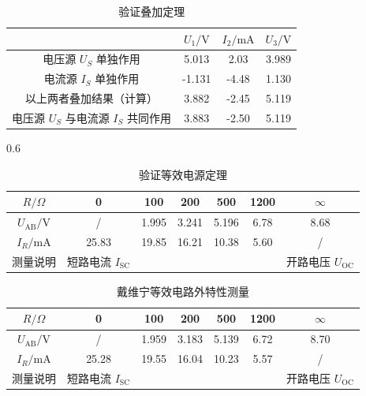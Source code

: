 ﻿\documentclass[10.5pt]{config}
\begin{document}
\begin{table}[H]
    \centering
    \small
    \begin{tabular}{|c|c|c|c|}
        \hline
         & $U_1/\mathrm{V}$ & $I_2/\mathrm{mA}$ & $U_3/\mathrm{V}$ \\
        \hline
        电压源 $U_S$ 单独作用 &5.013 & 2.03&3.989 \\
        \hline
        电流源 $I_S$ 单独作用 & -1.131& -4.48& 1.130\\
        \hline
        以上两者叠加结果（计算）  & 3.882& -2.45& 5.119\\
        \hline
        电压源 $U_S$ 与电流源 $I_S$ 共同作用 & 3.883& -2.50&5.119 \\
        \hline
    \end{tabular}
    \caption{验证叠加定理}
    \label{tab:superposition}
\end{table}

0.6
\begin{table}[H]
    \centering
    \small
    \begin{tabular}{|c|c|c|c|c|c|c|}
        \hline
        $R/\Omega$ & 0 & 100 & 200 & 500 & 1200 & $\infty$ \\
        \hline
        $U_{\mathrm{AB}}/\mathrm{V}$ & /& 1.995& 3.241& 5.196&6.78 & 8.68\\
        \hline
        $I_R/\mathrm{mA}$ &25.83 &19.85 &16.21 &10.38 &5.60 &/ \\
        \hline
        测量说明 & 短路电流 $I_{\mathrm{SC}}$ & & & & & 开路电压 $U_{\mathrm{OC}}$ \\
        \hline
    \end{tabular}
    \caption{验证等效电源定理}
    \label{tab:thevenin}
\end{table}

\begin{table}[H]
    \centering
    \small
    \begin{tabular}{|c|c|c|c|c|c|c|}
        \hline
        $R/\Omega$ & 0 & 100 & 200 & 500 & 1200 & $\infty$ \\
        \hline
        $U_{\mathrm{AB}}/\mathrm{V}$ & /&1.959 &3.183 &5.139& 6.72&8.70 \\
        \hline
        $I_R/\mathrm{mA}$ &25.28 &19.55 &16.04&10.23 &5.57 &/ \\
        \hline
        测量说明 & 短路电流 $I_{\mathrm{SC}}$ & & &  & &  开路电压 $U_{\mathrm{OC}}$ \\
        \hline
    \end{tabular}
    \caption{戴维宁等效电路外特性测量}
    \label{tab:thevenin_equiv}
\end{table}
\end{document}

